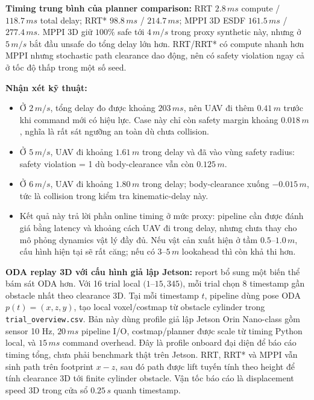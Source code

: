 \documentclass[10pt,a4paper]{article}
\newcommand{\code}[1]{\texttt{#1}}
\begin{document}
\textbf{Timing trung bình của planner comparison:} RRT \(2.8\,ms\) compute / \(118.7\,ms\) total delay; RRT* \(98.8\,ms\) / \(214.7\,ms\); MPPI 3D ESDF \(161.5\,ms\) / \(277.4\,ms\). MPPI 3D giữ \(100\%\) safe tới \(4\,m/s\) trong proxy synthetic này, nhưng ở \(5\,m/s\) bắt đầu unsafe do tổng delay lớn hơn. RRT/RRT* có compute nhanh hơn MPPI nhưng stochastic path clearance dao động, nên có safety violation ngay cả ở tốc độ thấp trong một số seed.

\textbf{Nhận xét kỹ thuật:}
\begin{itemize}
  \item Ở \(2\,m/s\), tổng delay đo được khoảng \(203\,ms\), nên UAV đi thêm \(0.41\,m\) trước khi command mới có hiệu lực. Case này chỉ còn safety margin khoảng \(0.018\,m\), nghĩa là rất sát ngưỡng an toàn dù chưa collision.
  \item Ở \(5\,m/s\), UAV đi khoảng \(1.61\,m\) trong delay và đã vào vùng safety radius: safety violation = 1 dù body-clearance vẫn còn \(0.125\,m\).
  \item Ở \(6\,m/s\), UAV đi khoảng \(1.80\,m\) trong delay; body-clearance xuống \(-0.015\,m\), tức là collision trong kiểm tra kinematic-delay này.
  \item Kết quả này trả lời phần online timing ở mức proxy: pipeline cần được đánh giá bằng latency và khoảng cách UAV đi trong delay, nhưng chưa thay cho mô phỏng dynamics vật lý đầy đủ. Nếu vật cản xuất hiện ở tầm \(0.5\)--\(1.0\,m\), cấu hình hiện tại sẽ rất căng; nếu có \(3\)--\(5\,m\) lookahead thì còn khả thi hơn.
\end{itemize}

\textbf{ODA replay 3D với cấu hình giả lập Jetson:} report bổ sung một biến thể bám sát ODA hơn. Với 16 trial local \((1\)--\(15,345)\), mỗi trial chọn 8 timestamp gần obstacle nhất theo clearance 3D. Tại mỗi timestamp \(t\), pipeline dùng pose ODA \(p(t)=(x,z,y)\), tạo local voxel/costmap từ obstacle cylinder trong \code{trial\_overview.csv}. Bản này dùng profile giả lập Jetson Orin Nano-class gồm sensor 10 Hz, \(20\,ms\) pipeline I/O, costmap/planner được scale từ timing Python local, và \(15\,ms\) command overhead. Đây là profile onboard đại diện để báo cáo timing tổng, chưa phải benchmark thật trên Jetson. RRT, RRT* và MPPI vẫn sinh path trên footprint \(x-z\), sau đó path được lift tuyến tính theo height để tính clearance 3D tới finite cylinder obstacle. Vận tốc báo cáo là displacement speed 3D trong cửa sổ \(0.25\,s\) quanh timestamp.
\end{document}

